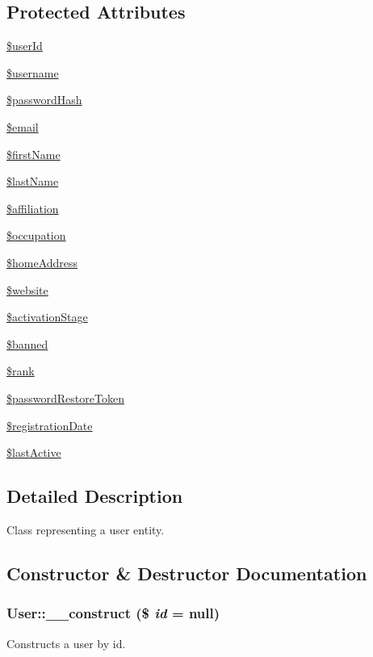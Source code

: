 \subsection*{Protected Attributes}
\begin{DoxyCompactItemize}
\item 
\hyperlink{classUser_abe744027963c3e398da9ad95316ace0d}{\$userId}
\item 
\hyperlink{classUser_ad22e19a56691cba5dc54ac38a91b79ff}{\$username}
\item 
\hyperlink{classUser_a329d5d877d90e34b99c969fd573c8f50}{\$passwordHash}
\item 
\hyperlink{classUser_a3bef7b70689d1e56cafbf750ff6a4aed}{\$email}
\item 
\hyperlink{classUser_ab4216ecb16d420f69cb32659a6744846}{\$firstName}
\item 
\hyperlink{classUser_a4f49336b16dc2612dae2069a078f4f14}{\$lastName}
\item 
\hyperlink{classUser_aea3a79f42359f935052c79cf9ad702f3}{\$affiliation}
\item 
\hyperlink{classUser_a434aa8daa7cab054eb51aa15546156b1}{\$occupation}
\item 
\hyperlink{classUser_a1588ee38de5c013009e557c4806178cf}{\$homeAddress}
\item 
\hyperlink{classUser_a9908094d21697133de85c18d68bb94f3}{\$website}
\item 
\hyperlink{classUser_a995afa541722c3e53380a54850f56048}{\$activationStage}
\item 
\hyperlink{classUser_a80dcdcc86bf2441ac7f7c130da7e182e}{\$banned}
\item 
\hyperlink{classUser_ae9be7cedf59f3dda300308505cfd5948}{\$rank}
\item 
\hyperlink{classUser_a499d31c84301d5ff26c38906c74fab82}{\$passwordRestoreToken}
\item 
\hyperlink{classUser_a879b23c07bcc1cae216a9ebc2faf3750}{\$registrationDate}
\item 
\hyperlink{classUser_ad393a3516b907e89164108fc68ae05bf}{\$lastActive}
\end{DoxyCompactItemize}


\subsection{Detailed Description}
Class representing a user entity. 

\subsection{Constructor \& Destructor Documentation}
\hypertarget{classUser_a7f239ff8d348251c654efb7c15763ab8}{
\subsubsection[{\_\-\_\-construct}]{\setlength{\rightskip}{0pt plus 5cm}User::\_\-\_\-construct (\$ {\em id} = {\ttfamily null})}}
\label{classUser_a7f239ff8d348251c654efb7c15763ab8}
Constructs a user by id.



